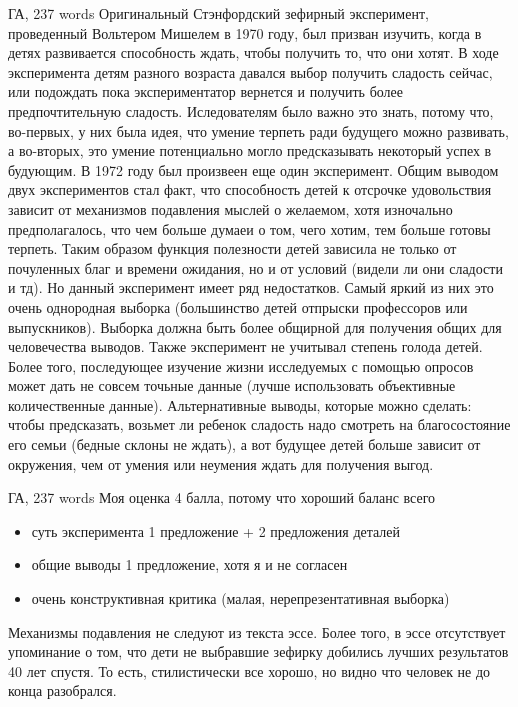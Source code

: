 \documentclass{beamer}
\begin{document}
\begin{frame}{ГА, 237 words}
\tiny
Оригинальный Стэнфордский зефирный эксперимент, проведенный Вольтером Мишелем в 1970 году, был призван изучить, когда в детях развивается способность ждать, чтобы получить то, что они хотят. \alert{В ходе эксперимента детям разного возраста давался выбор получить сладость сейчас, или подождать пока экспериментатор вернется и получить более предпочтительную сладость.} Иследователям было важно это знать, потому что, во-первых, у них была идея, что умение терпеть ради будущего можно развивать, а во-вторых, это умение потенциально могло предсказывать некоторый успех в будующим. В 1972 году был произвеен еще один эксперимент. \alert{Общим выводом двух экспериментов стал факт, что способность детей к отсрочке удовольствия зависит от механизмов подавления мыслей о желаемом}, хотя изночально предполагалось, что чем больше думаеи о том, чего хотим, тем больше готовы терпеть. \alert{Таким образом функция полезности детей зависила не только от почуленных благ и времени ожидания, но и от условий (видели ли они сладости и тд). Но данный эксперимент имеет ряд недостатков.} Самый яркий из них это очень однородная выборка (большинство детей отпрыски профессоров или выпускников). Выборка должна быть более общирной для получения общих для человечества выводов. Также эксперимент не учитывал степень голода детей. Более того, последующее изучение жизни исследуемых с помощью опросов может дать не совсем точьные данные (лучше использовать объективные количественные данные). 
\alert{Альтернативные выводы, которые можно сделать: чтобы предсказать, возьмет ли ребенок сладость надо смотреть на благосостояние его семьи (бедные склоны не ждать), а вот будущее детей больше зависит от окружения, чем от умения или неумения ждать для получения выгод.}
\end{frame}

\begin{frame}{ГА, 237 words}
Моя оценка 4 балла, потому что хороший баланс всего\begin{itemize}
  \item суть эксперимента 1 предложение + 2 предложения деталей
  \item общие выводы 1 предложение, хотя я и не согласен
  \item очень конструктивная критика (малая, нерепрезентативная выборка)
\end{itemize}
Механизмы подавления не следуют из текста эссе. Более того, в эссе отсутствует упоминание о том, что дети не выбравшие зефирку добились лучших результатов 40 лет спустя. То есть, стилистически все хорошо, но видно что человек не до конца разобрался.
\end{frame}
\end{document}
